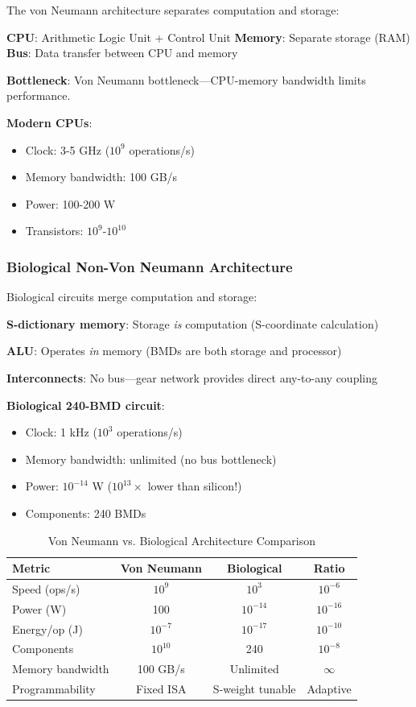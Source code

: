 \documentclass[11pt,a4paper]{article}
\begin{document}
The von Neumann architecture separates computation and storage\cite{vonneumann1945first}:

\textbf{CPU}: Arithmetic Logic Unit + Control Unit
\textbf{Memory}: Separate storage (RAM)
\textbf{Bus}: Data transfer between CPU and memory

\textbf{Bottleneck}: Von Neumann bottleneck—CPU-memory bandwidth limits performance.

\textbf{Modern CPUs}:
\begin{itemize}
\item Clock: 3-5 GHz ($10^9$ operations/s)
\item Memory bandwidth: 100 GB/s
\item Power: 100-200 W
\item Transistors: $10^9$-$10^{10}$
\end{itemize}

\subsubsection{Biological Non-Von Neumann Architecture}

Biological circuits merge computation and storage:

\textbf{S-dictionary memory}: Storage \textit{is} computation (S-coordinate calculation)

\textbf{ALU}: Operates \textit{in} memory (BMDs are both storage and processor)

\textbf{Interconnects}: No bus—gear network provides direct any-to-any coupling

\textbf{Biological 240-BMD circuit}:
\begin{itemize}
\item Clock: 1 kHz ($10^3$ operations/s)
\item Memory bandwidth: unlimited (no bus bottleneck)
\item Power: $10^{-14}$ W ($10^{13}\times$ lower than silicon!)
\item Components: 240 BMDs
\end{itemize}

\begin{table}[H]
\centering
\caption{Von Neumann vs. Biological Architecture Comparison}
\begin{tabular}{lccc}
\toprule
\textbf{Metric} & \textbf{Von Neumann} & \textbf{Biological} & \textbf{Ratio} \\
\midrule
Speed (ops/s) & $10^9$ & $10^3$ & $10^{-6}$ \\
Power (W) & 100 & $10^{-14}$ & $10^{-16}$ \\
Energy/op (J) & $10^{-7}$ & $10^{-17}$ & $10^{-10}$ \\
Components & $10^{10}$ & 240 & $10^{-8}$ \\
Memory bandwidth & 100 GB/s & Unlimited & $\infty$ \\
Programmability & Fixed ISA & S-weight tunable & Adaptive \\
\bottomrule
\end{tabular}
\end{table}
\end{document}
